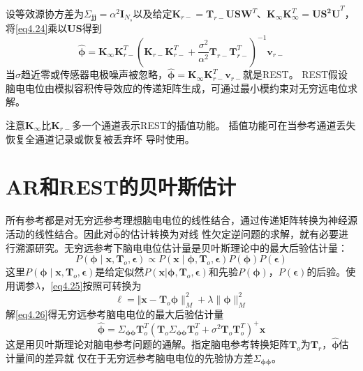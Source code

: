 设等效源协方差为$\Sigma_\mathbf{jj}=\alpha^2\mathbf{I}_{N_s}$以及给定$\mathbf{K}_{r-}=\mathbf{T}_{r-}\mathbf{USW}^T$、$\mathbf{K}_{\infty}\mathbf{K}_{\infty}^T=\mathbf{US^2U}^T$，将\eqref{eq4.24}乘以$\mathbf{US}$得到
\begin{equation*}
\hat{\mathbf{\phi}}=\mathbf{K}_{\infty}\mathbf{K}_{r-}^T(\mathbf{K}_{r-}\mathbf{K}_{r-}^T+\frac{\sigma^2}{\alpha^2}\mathbf{T}_{r-}\mathbf{T}_{r-}^T)^{-1}\mathbf{v}_{r-}
\end{equation*}
当$\sigma$趋近零或传感器电极噪声被忽略，$\hat{\mathbf{\phi}}=\mathbf{K}_{\infty}\mathbf{K}_{r-}^T\mathbf{v}_{r-}$就是REST。
REST假设脑电电位由模拟容积传导效应的传递矩阵生成，可通过最小模约束对无穷远电位求解。

注意$\mathbf{K}_{\infty}$比$\mathbf{K}_{r-}$多一个通道表示REST的插值功能。 插值功能可在当参考通道丢失恢复全通道记录或恢复被丢弃坏
导时使用。

\section{AR和REST的贝叶斯估计}
所有参考都是对无穷远参考理想脑电电位的线性结合，通过传递矩阵转换为神经源活动的线性结合。因此对$\hat{\mathbf{\phi}}$的估计转换为对线
性欠定逆问题的求解，就有必要进行溯源研究。无穷远参考下脑电电位估计量是贝叶斯理论中的最大后验估计量：
\begin{equation}\label{eq4.25}
P(\mathbf{\phi}\mid\mathbf{x},\mathbf{T}_o,\mathbf{\epsilon})\propto{P(\mathbf{x}\mid\mathbf{\phi},\mathbf{T}_o,\mathbf{\epsilon})P(\mathbf{\phi})P(\mathbf{\epsilon})}
\end{equation}
这里$P(\mathbf{\phi}\mid\mathbf{x},\mathbf{T}_o,\mathbf{\epsilon})$是给定似然$P(\mathbf{x}|\mathbf{\phi},\mathbf{T}_o,\mathbf{\epsilon})$和先验$P(\mathbf{\phi})$，$P(\mathbf{\epsilon})$的后验。使用调参$\lambda$，\eqref{eq4.25}按照\cite{noauthor_mardia_nodate}可转换为
\begin{equation}\label{eq4.26}
\ell = \Vert\mathbf{x}-\mathbf{T}_o\mathbf{\phi}\rVert_M^2+\lambda\lVert\mathbf{\phi}\rVert_M^2
\end{equation}
解\eqref{eq4.26}得无穷远参考脑电电位的最大后验估计量
\begin{equation}\label{eq4.27}
\hat{\mathbf{\phi}}=\Sigma_\mathbf{\phi\phi}\mathbf{T}_o^T(\mathbf{T}_o\Sigma_\mathbf{\phi\phi}\mathbf{T}_o^T+\sigma^2\mathbf{T}_o\mathbf{T}_o^T)^+\mathbf{x}
\end{equation}
这是用贝叶斯理论对脑电参考问题的通解。指定脑电参考转换矩阵$\mathbf{T}_o$为$\mathbf{T}_r$，$\hat{\mathbf{\phi}}$估计量间的差异就
仅在于无穷远参考脑电电位的先验协方差$\Sigma_{\mathbf{\phi\phi}}$。

